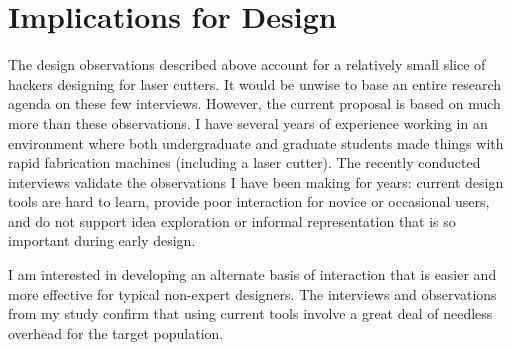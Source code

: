 \documentclass[12pt]{article}
\begin{document}
\section{Implications for Design}

The design observations described above account for a relatively small
slice of hackers designing for laser cutters. It would be unwise to
base an entire research agenda on these few interviews. However, the
current proposal is based on much more than these observations. I have
several years of experience working in an environment where both
undergraduate and graduate students made things with rapid fabrication
machines (including a laser cutter). The recently conducted interviews
validate the observations I have been making for years: current design
tools are hard to learn, provide poor interaction for novice or
occasional users, and do not support idea exploration or informal
representation that is so important during early design.

I am interested in developing an alternate basis of interaction that
is easier and more effective for typical non-expert designers. The
interviews and observations from my study confirm that using current
tools involve a great deal of needless overhead for the target
population.



\end{document}
